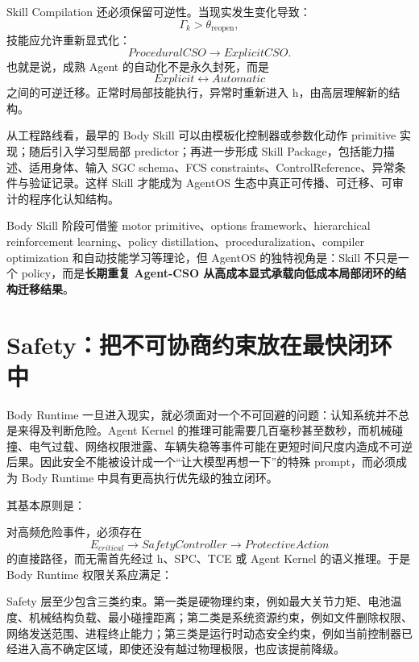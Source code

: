 Skill Compilation 还必须保留可逆性。当现实发生变化导致：
\[
\Gamma_k>\theta_{\mathrm{reopen}},
\]
技能应允许重新显式化：
\[
ProceduralCSO
\rightarrow
ExplicitCSO.
\]
也就是说，成熟 Agent 的自动化不是永久封死，而是
\[
Explicit
\leftrightarrow
Automatic
\]
之间的可逆迁移。正常时局部技能执行，异常时重新进入 h，由高层理解新的结构。

从工程路线看，最早的 Body Skill 可以由模板化控制器或参数化动作 primitive 实现；随后引入学习型局部 predictor；再进一步形成 Skill Package，包括能力描述、适用身体、输入 SGC schema、FCS constraints、ControlReference、异常条件与验证记录。这样 Skill 才能成为 AgentOS 生态中真正可传播、可迁移、可审计的程序化认知结构。

Body Skill 阶段可借鉴 motor primitive、options framework、hierarchical reinforcement learning、policy distillation、proceduralization、compiler optimization 和自动技能学习等理论，但 AgentOS 的独特视角是：Skill 不只是一个 policy，而是\textbf{长期重复 Agent-CSO 从高成本显式承载向低成本局部闭环的结构迁移结果}。

\section{Safety：把不可协商约束放在最快闭环中}

Body Runtime 一旦进入现实，就必须面对一个不可回避的问题：认知系统并不总是来得及判断危险。Agent Kernel 的推理可能需要几百毫秒甚至数秒，而机械碰撞、电气过载、网络权限泄露、车辆失稳等事件可能在更短时间尺度内造成不可逆后果。因此安全不能被设计成一个“让大模型再想一下”的特殊 prompt，而必须成为 Body Runtime 中具有更高执行优先级的独立闭环。

其基本原则是：
\begin{statementbox}
\centering
{}
\end{statementbox}
对高频危险事件，必须存在
\[
E_{critical}
\rightarrow
SafetyController
\rightarrow
ProtectiveAction
\]
的直接路径，而无需首先经过 h、SPC、TCE 或 Agent Kernel 的语义推理。于是 Body Runtime 权限关系应满足：
\begin{statementbox}
\centering
{}
\end{statementbox}

Safety 层至少包含三类约束。第一类是硬物理约束，例如最大关节力矩、电池温度、机械结构负载、最小碰撞距离；第二类是系统资源约束，例如文件删除权限、网络发送范围、进程终止能力；第三类是运行时动态安全约束，例如当前控制器已经进入高不确定区域，即使还没有越过物理极限，也应该提前降级。

